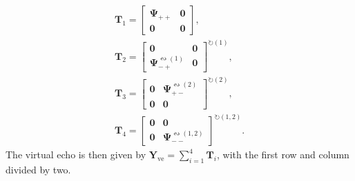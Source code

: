 \begin{subequations}
    \begin{gather}
        \symbf{T}_1 =
        \begin{bmatrix}
            \symbf{\Psi}_{++} & \symbf{0} \\
            \symbf{0} & \symbf{0}
        \end{bmatrix}, \\
        \symbf{T}_2 =
        \begin{bmatrix}
            \symbf{0} & \symbf{0} \\
            \symbf{\Psi}_{-+}^{\leftrightsquigarrow (1)} & \symbf{0}
        \end{bmatrix}^{\circlearrowright (1)}, \\
        \symbf{T}_3 =
        \begin{bmatrix}
            \symbf{0} & \symbf{\Psi}_{+-}^{\leftrightsquigarrow (2)} \\
            \symbf{0} & \symbf{0}
        \end{bmatrix}^{\circlearrowright (2)}, \\
        \symbf{T}_4 =
        \begin{bmatrix}
            \symbf{0} & \symbf{0} \\
            \symbf{0} & \symbf{\Psi}_{--}^{\leftrightsquigarrow (1,2)}
        \end{bmatrix}^{\circlearrowright (1,2)}.
    \end{gather}
\end{subequations}
The virtual echo is then given by $\symbf{Y}_{\text{ve}} = \sum_{i=1}^4
\symbf{T}_i$, with the first row and column divided by two.

